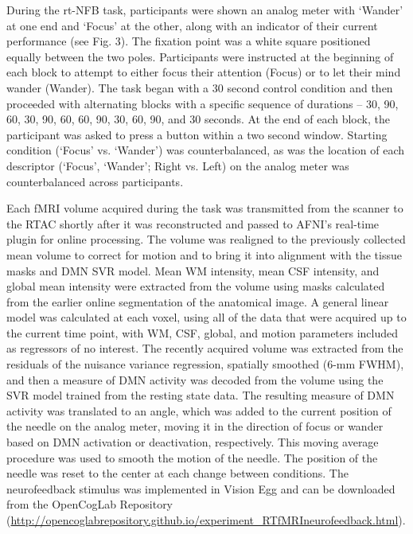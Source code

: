 During the rt-NFB task, participants were shown an analog meter with ‘Wander’ at one end and ‘Focus’ at the other, along with an indicator of their current performance (see Fig. 3). The fixation point was a white square positioned equally between the two poles. Participants were instructed at the beginning of each block to attempt to either focus their attention (Focus) or to let their mind wander (Wander). The task began with a 30 second control condition and then proceeded with alternating blocks with a specific sequence of durations -- 30, 90, 60, 30, 90, 60, 60, 90, 30, 60, 90, and 30 seconds. At the end of each block, the participant was asked to press a button within a two second window. Starting condition (‘Focus’ vs. ‘Wander’) was counterbalanced, as was the location of each descriptor (‘Focus’, ‘Wander’; Right vs. Left) on the analog meter was counterbalanced across participants.

Each fMRI volume acquired during the task was transmitted from the scanner to the RTAC shortly after it was reconstructed and passed to AFNI’s real-time plugin \cite{Cox1995} for online processing. The volume was realigned to the previously collected mean volume to correct for motion and to bring it into alignment with the tissue masks and DMN SVR model. Mean WM intensity, mean CSF intensity, and global mean intensity were extracted from the volume using masks calculated from the earlier online segmentation of the anatomical image. A general linear model was calculated at each voxel, using all of the data that were acquired up to the current time point, with WM, CSF, global, and motion parameters included as regressors of no interest. The recently acquired volume was extracted from the residuals of the nuisance variance regression, spatially smoothed (6-mm FWHM), and then a measure of DMN activity was decoded from the volume using the SVR model trained from the resting state data. The resulting measure of DMN activity was translated to an angle, which was added to the current position of the needle on the analog meter, moving it in the direction of focus or wander based on DMN activation or deactivation, respectively. This moving average procedure was used to smooth the motion of the needle. The position of the needle was reset to the center at each change between conditions. The neurofeedback stimulus was implemented in Vision Egg \cite{Straw2008} and can be downloaded from the OpenCogLab Repository (\url{http://opencoglabrepository.github.io/experiment\_RTfMRIneurofeedback.html}).

